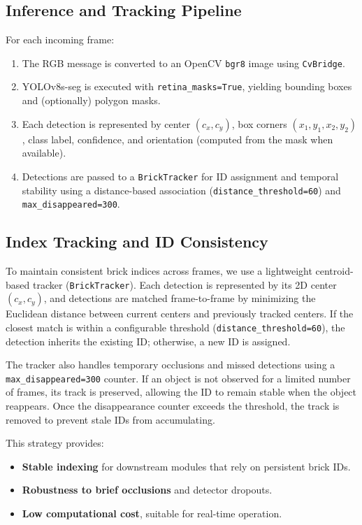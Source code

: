 \subsection{Inference and Tracking Pipeline}
For each incoming frame:
\begin{enumerate}
    \item The RGB message is converted to an OpenCV \texttt{bgr8} image using \texttt{CvBridge}.
    \item YOLOv8s-seg is executed with \texttt{retina\_masks=True}, yielding bounding boxes and (optionally) polygon masks.
    \item Each detection is represented by center $(c_x, c_y)$, box corners $(x_1, y_1, x_2, y_2)$, class label, confidence, and orientation (computed from the mask when available).
    \item Detections are passed to a \texttt{BrickTracker} for ID assignment and temporal stability using a distance-based association (\texttt{distance\_threshold=60}) and \texttt{max\_disappeared=300}.
\end{enumerate}

\subsection{Index Tracking and ID Consistency}
To maintain consistent brick indices across frames, we use a lightweight centroid-based tracker (\texttt{BrickTracker}). Each detection is represented by its 2D center $(c_x, c_y)$, and detections are matched frame-to-frame by minimizing the Euclidean distance between current centers and previously tracked centers. If the closest match is within a configurable threshold (\texttt{distance\_threshold=60}), the detection inherits the existing ID; otherwise, a new ID is assigned.

The tracker also handles temporary occlusions and missed detections using a \texttt{max\_disappeared=300} counter. If an object is not observed for a limited number of frames, its track is preserved, allowing the ID to remain stable when the object reappears. Once the disappearance counter exceeds the threshold, the track is removed to prevent stale IDs from accumulating.

This strategy provides:
\begin{itemize}
    \item \textbf{Stable indexing} for downstream modules that rely on persistent brick IDs.
    \item \textbf{Robustness to brief occlusions} and detector dropouts.
    \item \textbf{Low computational cost}, suitable for real-time operation.
\end{itemize}


